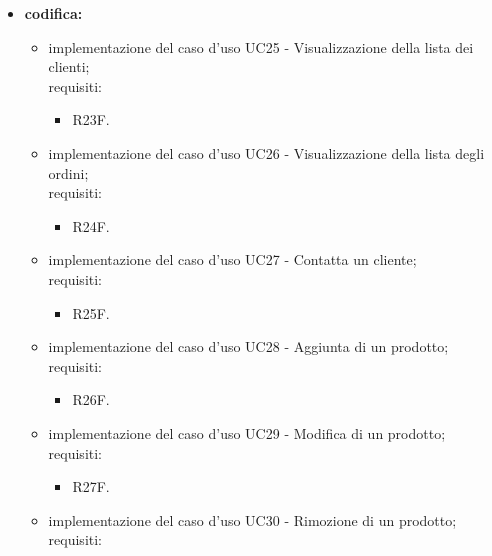 \begin{itemize}
    \item \textbf{codifica:}
          \begin{itemize}
              \item implementazione del caso d'uso UC25 - Visualizzazione della lista dei clienti;\\
                    requisiti:
                    \begin{itemize}
                        \item R23F.
                    \end{itemize}
              \item implementazione del caso d'uso UC26 - Visualizzazione della lista degli ordini;\\
                    requisiti:
                    \begin{itemize}
                        \item R24F.
                    \end{itemize}
                    \item implementazione del caso d'uso UC27 - Contatta un cliente;\\
                    requisiti:
                    \begin{itemize}
                        \item R25F.
                    \end{itemize}
              \item implementazione del caso d'uso UC28 -  Aggiunta di un prodotto;\\
                    requisiti:
                    \begin{itemize}
                        \item R26F.
                    \end{itemize}
              \item implementazione del caso d'uso UC29 - Modifica di un prodotto;\\
                    requisiti:
                    \begin{itemize}
                        \item R27F.
                    \end{itemize}
              \item implementazione del caso d'uso UC30 - Rimozione di un prodotto;\\
                    requisiti:
                    \begin{itemize}

\end{itemize}
\end{itemize}
\end{itemize}

